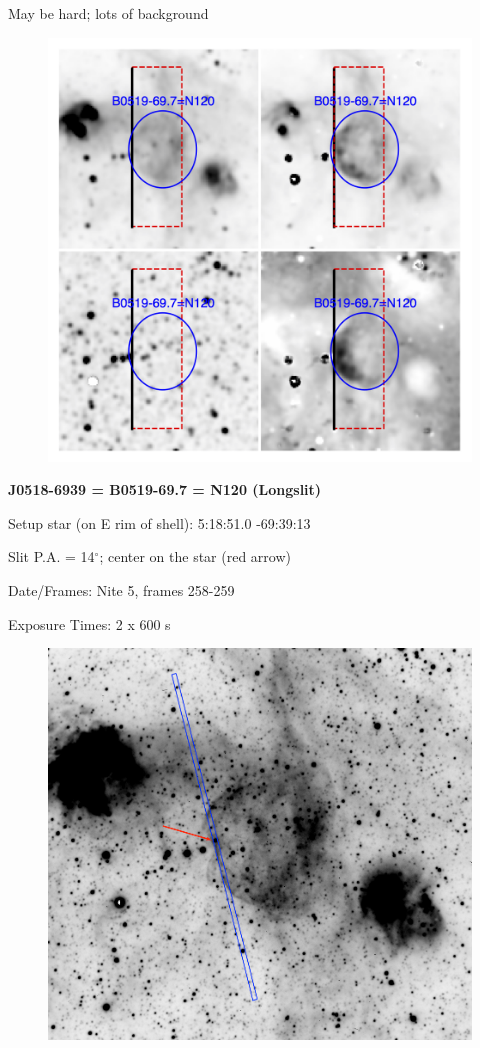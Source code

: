 \documentclass[11pt]{article}
\begin{document}
May be hard; lots of background
\begin{figure}
\includegraphics[width=12.5cm]{snapshots/N120_5arcmin.png}
\end{figure}

\newpage
{\bf J0518-6939 = B0519-69.7 = N120  (Longslit)}  
 
Setup star (on E rim of shell):   5:18:51.0  -69:39:13     

Slit P.A. = 14$^\circ$; center on the star (red arrow)

Date/Frames:  Nite 5, frames 258-259

Exposure Times:  2 x 600 s 

\begin{figure}
\includegraphics[width=12.5cm]{snapshots/N120_longslit.png}
\end{figure}
\end{document}
